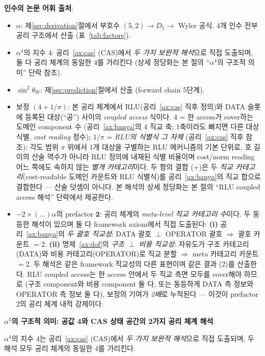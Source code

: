 \documentclass[entropy,article,submit,pdftex,oneauthor]{Definitions/mdpi}
\begin{document}
\textbf{인수의 논문 어휘 출처}:
\begin{itemize}
\item $\alpha$: 제\ref{sec:derivation}절에서 부호수 $(5,2) \to D_5 \to$ Wyler 공식. 4개 인수 전부 공리 구조에서 산출 (표~\ref{tab:factors}).
\item $\alpha^4$의 지수 $4$: 공리~\ref{ax:cas} (CAS)에서 \emph{두 가지 보완적 해석}으로 직접 도출되며, 둘 다 공리 체계의 동일한 4를 가리킨다 (상세 정당화는 본 절의 ``$\alpha^4$의 구조적 의미'' 단락 참조).
\item $\sin^2\theta_W$: 제\ref{sec:prediction}절에서 산출 (forward chain 5단계).
\item 보정 $(4 + 1/\pi)$: 본 공리 체계에서 RLU(공리~\ref{ax:cas} 직후 정의)와 DATA 슬롯에 등록된 대상(``공'') 사이의 \emph{coupled access} 식이다. $4$ = 한 access가 cover하는 도메인 component 수 (공리~\ref{ax:banya}의 4 직교 축; 1축이라도 빠지면 다른 대상 식별, \emph{cost reading} 정수); $1/\pi$ = \emph{RLU의 식별식 그 자체} (공리~\ref{ax:cas} 직후 참조): 각도 범위 $\pi$ 위에서 1개 대상을 구별하는 RLU 메커니즘의 기본 단위로, 호 길이의 산술 역수가 아니라 RLU 정의에 내재된 식별 비율이며 cost/norm reading 어느 쪽에도 속하지 않는 \emph{별개 카테고리}이다. 두 항의 결합 ($+$)은 두 \emph{직교 카테고리}(cost-readable 도메인 카운트와 RLU 식별식)를 공리~\ref{ax:banya}의 직교 합으로 결합한다 --- 산술 덧셈이 아니다. 본 해석의 상세 정당화는 본 절의 ``RLU coupled access 해석'' 단락에서 제공한다.
\item $-2 \times (\ldots) \alpha$의 prefactor $\mathbf{2}$: 공리 체계의 \emph{meta-level 직교 카테고리 수}이다. 두 동등한 해석이 있으며 둘 다 framework axiom에서 직접 도출된다: \textbf{(i)} 공리~\ref{ax:banya}의 \emph{두 괄호 직교성}: DATA 괄호 $\perp$ OPERATOR 괄호 $\Rightarrow$ 괄호 카운트 $= 2$. \textbf{(ii)} 명제~\ref{ax:dof}의 \emph{구조 $\perp$ 비용 직교성}: 자유도가 구조 카테고리(DATA)와 비용 카테고리(OPERATOR)로 직교 분할 $\Rightarrow$ meta 카테고리 카운트 $= 2$. 두 해석은 같은 framework 직교성의 다른 표현이며 같은 결과 ($2$)를 산출한다. RLU coupled access는 한 access 안에서 두 직교 측면 모두를 cover해야 하므로 (구조 component와 비용 component 둘 다, 또는 동등하게 DATA 측 정보와 OPERATOR 측 정보 둘 다), 보정의 기여가 \emph{2배}로 누적된다 --- 이것이 prefactor $2$의 공리 체계 내적 강제이다.
\end{itemize}

\textbf{$\alpha^4$의 구조적 의미: 공값 4와 CAS 상태 공간의 2가지 공리 체계 해석}.

$\alpha^4$의 지수 $4$는 공리~\ref{ax:cas} (CAS)에서 \emph{두 가지 보완적 해석}으로 직접 도출되며, 두 해석 모두 공리 체계의 동일한 4를 가리킨다.
\end{document}

